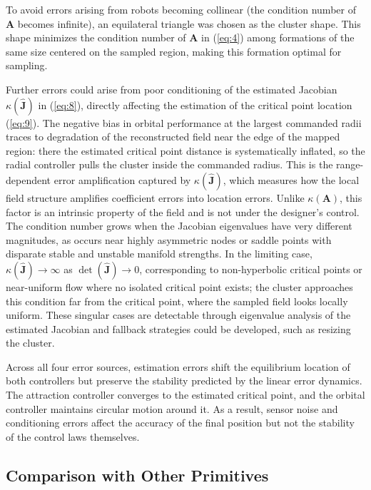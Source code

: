 \documentclass[lettersize,journal]{IEEEtran}
\begin{document}
To avoid errors arising from robots becoming collinear (the condition number of $\mathbf{A}$ becomes infinite), an equilateral triangle was chosen as the cluster shape. This shape minimizes the condition number of $\mathbf{A}$ in (\ref{eq:4}) among formations of the same size centered on the sampled region, making this formation optimal for sampling.

Further errors could arise from poor conditioning of the estimated Jacobian $\kappa(\hat{\mathbf{J}})$ in (\ref{eq:8}), directly affecting the estimation of the critical point location (\ref{eq:9}). The negative bias in orbital performance at the largest commanded radii traces to degradation of the reconstructed field near the edge of the mapped region: there the estimated critical point distance is systematically inflated, so the radial controller pulls the cluster inside the commanded radius. This is the range-dependent error amplification captured by $\kappa(\hat{\mathbf{J}})$, which measures how the local field structure amplifies coefficient errors into location errors. Unlike $\kappa(\mathbf{A})$, this factor is an intrinsic property of the field and is not under the designer's control. The condition number grows when the Jacobian eigenvalues have very different magnitudes, as occurs near highly asymmetric nodes or saddle points with disparate stable and unstable manifold strengths. In the limiting case, $\kappa(\hat{\mathbf{J}}) \to \infty$ as $\det(\hat{\mathbf{J}}) \to 0$, corresponding to non-hyperbolic critical points or near-uniform flow where no isolated critical point exists; the cluster approaches this condition far from the critical point, where the sampled field looks locally uniform. These singular cases are detectable through eigenvalue analysis of the estimated Jacobian and fallback strategies could be developed, such as resizing the cluster.

Across all four error sources, estimation errors shift the equilibrium location of both controllers but preserve the stability predicted by the linear error dynamics. The attraction controller converges to the estimated critical point, and the orbital controller maintains circular motion around it. As a result, sensor noise and conditioning errors affect the accuracy of the final position but not the stability of the control laws themselves.

\subsection{Comparison with Other Primitives}
\end{document}
